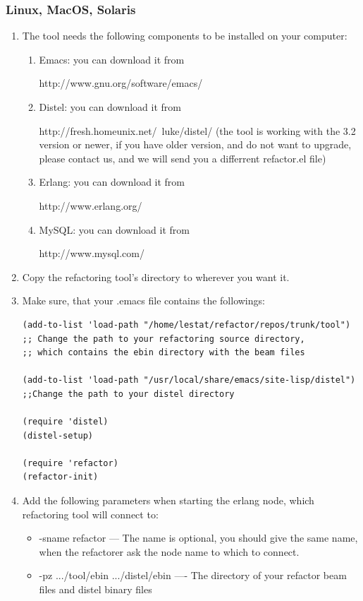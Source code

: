 \documentclass[12pt]{article}
\begin{document}
\subsubsection{Linux, MacOS, Solaris}
\begin{enumerate}
	\item The tool needs the following components to be installed on your computer:
\begin{enumerate}
	\item Emacs: you can download it from 
	
	http://www.gnu.org/software/emacs/
	\item Distel: you can download it from 
	
	http://fresh.homeunix.net/~luke/distel/ (the tool is working with the 3.2 version or newer, if you have older version, 
	and do not want to upgrade, please contact us, and we will send you a differrent refactor.el file)
	\item Erlang: you can download it from 
	
	http://www.erlang.org/
	\item MySQL: you can download it from 
	
	http://www.mysql.com/
\end{enumerate}
	\item Copy the refactoring tool's directory to wherever you want it.
	\item Make sure, that your .emacs file contains the followings:
	   
	   {\small \begin{Verbatim}
(add-to-list 'load-path "/home/lestat/refactor/repos/trunk/tool") 
;; Change the path to your refactoring source directory, 
;; which contains the ebin directory with the beam files
	   
(add-to-list 'load-path "/usr/local/share/emacs/site-lisp/distel") 
;;Change the path to your distel directory
	   
(require 'distel)
(distel-setup)
	   
(require 'refactor)
(refactor-init)
           \end{Verbatim}
           }
        \item Add the following parameters when starting the erlang node, which refactoring tool will connect to: 
               \begin{itemize}
	       	\item -sname refactor --- The name is optional, you should give the same name, when the refactorer ask the node name to which to connect.
                \item -pz .../tool/ebin .../distel/ebin ---- The directory 
                of your refactor beam files and distel binary files 	
	\end{itemize}
	       
\end{enumerate}
\end{document}
